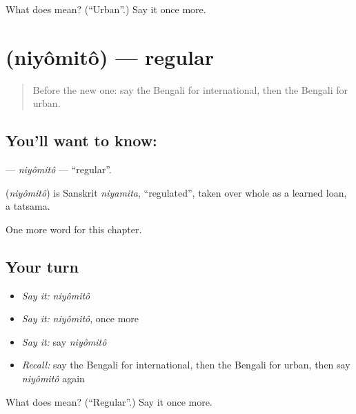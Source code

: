 \begin{tcolorbox}[breakable,colback=teal!4,colframe=teal!35!black,title={Before you move on}]
What does  mean? (\textquotedblleft{}Urban\textquotedblright{}.) Say it once more.
\end{tcolorbox}
\section[\texorpdfstring{\bn{নিয়মিত} (niyômitô)}{নিয়মিত (niyômitô)}]{ (niyômitô) — regular}

\label{lesson:BN-C221-niyomito}



\begin{quote}
Before the new one: say the Bengali for international, then the Bengali for urban.
\end{quote}

\subsection*{You'll want to know: }
\textbf{} — \emph{niyômitô} — \textquotedblleft{}regular\textquotedblright{}.

\begin{cousinweb}
\textbf{} (\emph{niyômitô}) is Sanskrit \emph{niyamita}, \textquotedblleft{}regulated\textquotedblright{}, taken over whole as a learned loan, a tatsama.
\end{cousinweb}

\begin{grammarlens}[title={What you've built}]
One more word for this chapter.
\end{grammarlens}

\subsection*{Your turn}
\begin{itemize}
\raggedright
  \item \emph{Say it:} \emph{niyômitô}
  \item \emph{Say it:} \emph{niyômitô}, once more
  \item \emph{Say it:} say \emph{niyômitô}
  \item \emph{Recall:} say the Bengali for international, then the Bengali for urban, then say \emph{niyômitô} again
\end{itemize}

\begin{tcolorbox}[breakable,colback=teal!4,colframe=teal!35!black,title={Before you move on}]
What does  mean? (\textquotedblleft{}Regular\textquotedblright{}.) Say it once more.
\end{tcolorbox}
